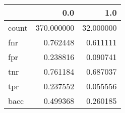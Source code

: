 \begin{tabular}{lrr}
\toprule
{} &         0.0 &        1.0 \\
\midrule
count &  370.000000 &  32.000000 \\
fnr   &    0.762448 &   0.611111 \\
fpr   &    0.238816 &   0.090741 \\
tnr   &    0.761184 &   0.687037 \\
tpr   &    0.237552 &   0.055556 \\
bacc  &    0.499368 &   0.260185 \\
\bottomrule
\end{tabular}
